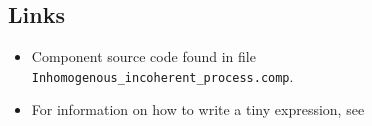 \subsection*{Links}
\begin{itemize}
  \item Component source code found in file \texttt{Inhomogenous\_incoherent\_process.comp}.
  \item For information on how to write a tiny expression, see 
\end{itemize}
